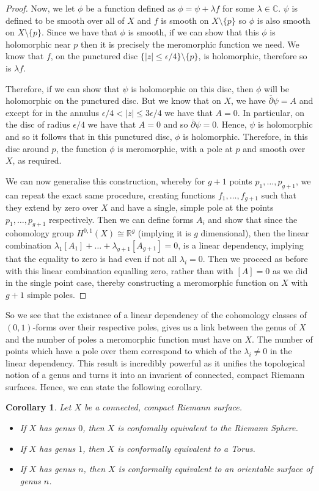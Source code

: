 \documentclass[11pt]{report}
\newtheorem{cor}[thm]{Corollary}
\theoremstyle{definition}
\begin{document}
\begin{proof}
  Now, we let $\phi$ be a function defined as $\phi = \psi + \lambda f$ for some $\lambda \in \mathbb{C}$. $\psi$ is defined to be smooth over all of $X$ and $f$ is smooth on $X\setminus \{p\}$ so $\phi$ is also smooth on $X \setminus \{p\}$. Since we have that $\phi$ is smooth, if we can show that this $\phi$ is holomorphic near $p$ then it is precisely the meromorphic function we need. We know that $f$, on the punctured disc $\{|z| \leq \epsilon / 4\} \setminus \{p\}$, is holomorphic, therefore so is $\lambda f$. 
  
  Therefore, if we can show that $\psi$ is holomorphic on this disc, then $\phi$ will be holomorphic on the punctured disc. But we know that on $X$, we have $\overline{\partial}\psi = A$ and except for in the annulus $\epsilon / 4 < |z| \leq 3\epsilon / 4$ we have that $A=0$. In particular, on the disc of radius $\epsilon / 4$ we have that $A=0$ and so $\overline{\partial}\psi = 0$. Hence, $\psi$ is holomorphic and so it follows that in this punctured disc, $\phi$ is holomorphic. Therefore, in this disc around $p$, the function $\phi$ is meromorphic, with a pole at $p$ and smooth over $X$, as required.

  We can now generalise this construction, whereby for $g+1$ points $p_1,\ldots, p_{g+1}$, we can repeat the exact same procedure, creating functions $f_1,\ldots,f_{g+1}$ such that they extend by zero over $X$ and have a single, simple pole at the points $p_1,\ldots,p_{g+1}$ respectively. Then we can define forms $A_i$ and show that since the cohomology group $H^{0,1}(X) \cong \mathbb{R}^g$ (implying it is $g$ dimensional), then the linear combination $\lambda_1[A_1]+\ldots+\lambda_{g+1}[A_{g+1}] = 0$, is a linear dependency, implying that the equality to zero is had even if not all $\lambda_i = 0$. Then we proceed as before with this linear combination equalling zero, rather than with $[A]=0$ as we did in the single point case, thereby constructing a meromorphic function on $X$ with $g+1$ simple poles. 
\end{proof}
So we see that the existance of a linear dependency of the cohomology classes of $(0,1)$-forms over their respective poles, gives us a link between the genus of $X$ and the number of poles a meromorphic function must have on $X$. The number of points which have a pole over them correspond to which of the $\lambda_i \neq 0$ in the linear dependency. This result is incredibly powerful as it unifies the topological notion of a genus and turns it into an invarient of connected, compact Riemann surfaces. Hence, we can state the following corollary.
\begin{cor}\label{ClassificationByGenus}
  Let $X$ be a connected, compact Riemann surface. 
  \begin{itemize}
    \item If $X$ has genus $0$, then $X$ is confomally equivalent to the Riemann Sphere. 
    \item If $X$ has genus $1$, then $X$ is conformally equivalent to a Torus.
    \item If $X$ has genus $n$, then $X$ is conformally equivalent to an orientable surface of genus $n$.
  \end{itemize}
\end{cor}
\end{document}
